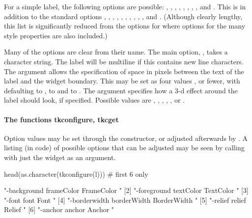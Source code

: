 For a simple label, the following options are possible: ,
, , , ,
, , , and .
This is in addition to the standard options ,
, , , ,
, , , ,
, and . (Although clearly lengthy, this
list is significantly reduced from the options for 
where options for the many style properties are also included.)

Many of the options are clear from their name.  The main option,
, takes a character string. The label will be multiline if
this contains new line characters.  The 
argument allows the specification of space in pixels between the text
of the label and the widget boundary. This may be set as four values
, or fewer, with 
defaulting to ,  to  and 
to . The  argument specifies how
a 3-d effect around the label should look, if specified. Possible
values are , , ,
, , or .

\paragraph{The functions tkconfigure, tkcget}

Option values may be set through the constructor, or adjusted
afterwards by . A listing (in \TCL\/ code) of possible options
that can be adjusted may be seen by calling 
with just the widget as an argument.

\begin{Schunk}
\begin{Sinput}
 head(as.character(tkconfigure(l)))      # first 6 only
\end{Sinput}
\begin{Soutput}
[1] "-background frameColor FrameColor {} {}"   
[2] "-foreground textColor TextColor {} {}"     
[3] "-font font Font {} {}"                     
[4] "-borderwidth borderWidth BorderWidth {} {}"
[5] "-relief relief Relief {} {}"               
[6] "-anchor anchor Anchor {} {}"               
\end{Soutput}
\end{Schunk}

